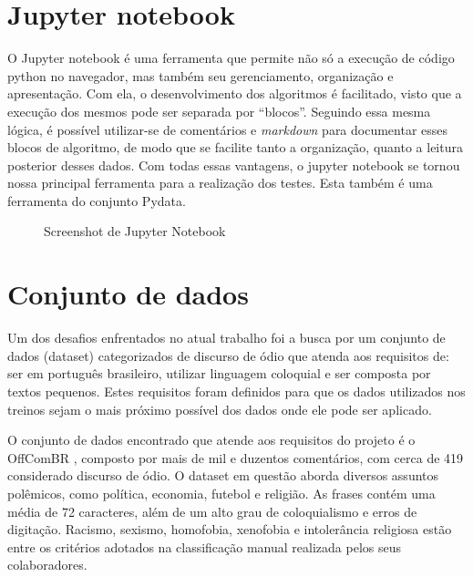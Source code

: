 \section{Jupyter notebook}

O Jupyter notebook é uma ferramenta que permite não só a execução de código python no navegador, mas também seu gerenciamento, organização e apresentação. Com ela, o desenvolvimento dos algoritmos é facilitado, visto que a execução dos mesmos pode ser separada por “blocos”. Seguindo essa mesma lógica, é possível utilizar-se de comentários e \textit{markdown} para documentar esses blocos de algoritmo, de modo que se facilite tanto a organização, quanto a leitura posterior desses dados. Com todas essas vantagens, o jupyter notebook se tornou nossa principal ferramenta para a realização dos testes. Esta também é uma ferramenta do conjunto Pydata.

\begin{figure}[!htb]
    \caption{\label{fig:jupyter} Screenshot de Jupyter Notebook}
\end{figure}

\section{Conjunto de dados}

Um dos desafios enfrentados no atual trabalho foi a busca por um conjunto de dados (dataset) categorizados de discurso de ódio que atenda aos requisitos de: ser em português brasileiro, utilizar linguagem coloquial e ser composta por textos pequenos. Estes requisitos foram definidos para que os dados utilizados nos treinos sejam o mais próximo possível dos dados onde ele pode ser aplicado.

O conjunto de dados encontrado que atende aos requisitos do projeto é o OffComBR \cite{Pelle2017}, composto por mais de mil e duzentos comentários, com cerca de 419 considerado discurso de ódio. O dataset em questão aborda diversos assuntos polêmicos, como política, economia, futebol e religião. As frases contém uma média de 72 caracteres, além de um alto grau de coloquialismo e erros de digitação. Racismo, sexismo, homofobia, xenofobia e intolerância religiosa estão entre os critérios adotados na classificação manual realizada pelos seus colaboradores.